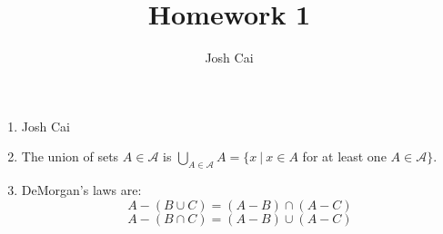 \documentclass{article}
\begin{document}
\title{Homework 1}
\author{Josh Cai}

\maketitle


\begin{enumerate}
\item 
Josh Cai

\item
The union of sets $A \in \mathcal{A}$ is $\displaystyle\bigcup_{A\in\mathcal{A}} A = \{x\: |\: x\in A$ for at least one $A\in\mathcal{A}\}$.

\item
DeMorgan's laws are: \[\displaystyle A-(B\cup C)=(A-B)\cap(A-C)\]
$$\displaystyle A-(B\cap C)=(A-B)\cup(A-C)$$

\end{enumerate}
\end{document}
